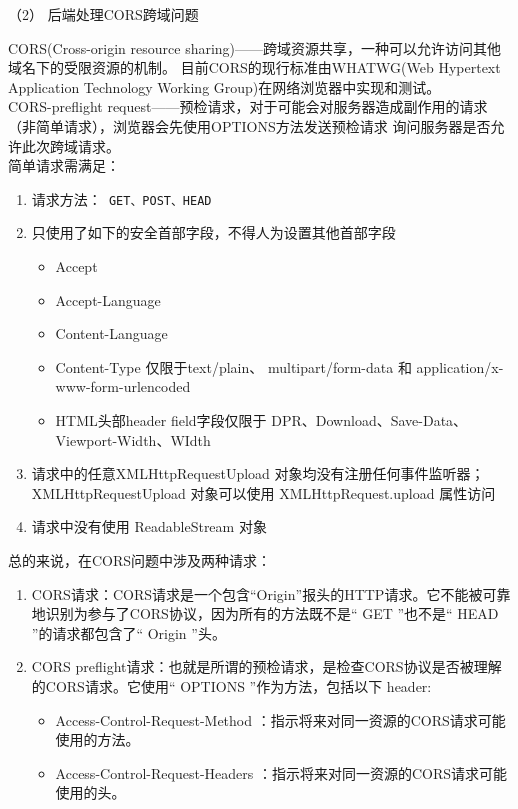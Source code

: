 （2） 后端处理CORS跨域问题

CORS(Cross-origin resource sharing)——跨域资源共享，一种可以允许访问其他域名下的受限资源的机制。
目前CORS的现行标准由WHATWG(Web Hypertext Application Technology Working Group)在网络浏览器中实现和测试。\\
CORS-preflight request——预检请求，对于可能会对服务器造成副作用的请求（非简单请求），浏览器会先使用OPTIONS方法发送预检请求
询问服务器是否允许此次跨域请求。\\
简单请求需满足：
\begin{enumerate}[label=\circled{\arabic*}]
  \item 请求方法：\lstinline[language = xml]| GET、POST、HEAD |
  \item 只使用了如下的安全首部字段，不得人为设置其他首部字段
        \begin{itemize}
          \item Accept
          \item Accept-Language
          \item Content-Language
          \item Content-Type 仅限于text/plain、 multipart/form-data 和 application/x-www-form-urlencoded
          \item HTML头部header field字段仅限于 DPR、Download、Save-Data、Viewport-Width、WIdth
        \end{itemize}
  \item 请求中的任意XMLHttpRequestUpload 对象均没有注册任何事件监听器；XMLHttpRequestUpload 对象可以使用 XMLHttpRequest.upload 属性访问
  \item 请求中没有使用 ReadableStream 对象
\end{enumerate}

总的来说，在CORS问题中涉及两种请求：

\begin{enumerate}[label=\circled{\arabic*}]
  \item CORS请求：CORS请求是一个包含“Origin”报头的HTTP请求。它不能被可靠地识别为参与了CORS协议，因为所有的方法既不是“ GET ”也不是“ HEAD ”的请求都包含了“ Origin ”头。
  \item CORS preflight请求：也就是所谓的预检请求，是检查CORS协议是否被理解的CORS请求。它使用“ OPTIONS ”作为方法，包括以下 header:
        \begin{itemize}
          \item  Access-Control-Request-Method ：指示将来对同一资源的CORS请求可能使用的方法。
          \item  Access-Control-Request-Headers ：指示将来对同一资源的CORS请求可能使用的头。
        \end{itemize}
\end{enumerate}

